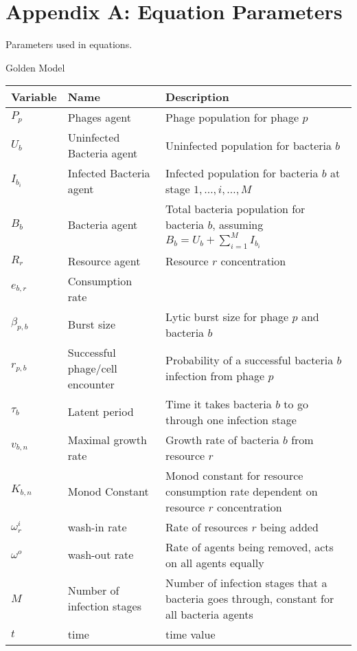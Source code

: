 \chapter{Appendix A: Equation Parameters}

\label{AppendixA}

Parameters used in equations. 

\begin{table}[htbp]
    \small %
    \centering
    Golden Model
    \begin{tabularx}{\textwidth}{l l X}
        \toprule
        \textbf{Variable} & \textbf{Name} & \textbf{Description} \\
        \midrule
        $P_p$ & Phages agent & Phage population for phage $p$ \\
        $U_b$ & Uninfected Bacteria agent & Uninfected population for bacteria $b$ \\
        $I_{b_i}$ & Infected Bacteria agent & Infected population for bacteria $b$ at stage $1, \dots, i, \dots, M$  \\
        $B_b$ & Bacteria agent & Total bacteria population for bacteria $b$, assuming $B_b = U_b + \sum_{i=1}^M I_{b_i}$ \\
        $R_r$ & Resource agent & Resource $r$ concentration\\
        $e_{b, r}$ & Consumption rate& \\
        $\beta_{p, b}$ & Burst size & Lytic burst size for phage $p$ and bacteria $b$\\
        $r_{p, b}$ & Successful phage/cell encounter & Probability of a successful bacteria $b$ infection from phage $p$\\
        $\tau_{b}$ & Latent period & Time it takes bacteria $b$ to go through one infection stage\\
        $v_{b, n}$ & Maximal growth rate & Growth rate of bacteria $b$ from resource $r$ \\
        $K_{b, n}$ & Monod Constant & Monod constant for resource consumption rate dependent on resource $r$ concentration\\
        $\omega^i_r$ & wash-in rate & Rate of resources $r$ being added\\
        $\omega^o$ & wash-out rate & Rate of agents being removed, acts on all agents equally\\
        $M$ & Number of infection stages & Number of infection stages that a bacteria goes through, constant for all bacteria agents\\
        $t$ & time & time value \\
        \bottomrule
    \end{tabularx}\newline


\end{table}

